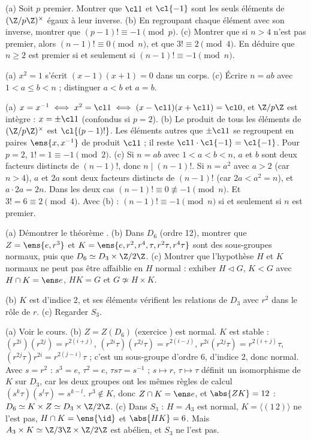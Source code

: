 \begin{exo}
(a) Soit $p$ premier. Montrer que $\cl1$ et $\cl{-1}$ sont les seuls éléments de $(\Z/p\Z)^\times$ égaux à leur inverse. (b) En regroupant chaque élément avec son inverse, montrer que $(p-1)!\equiv-1\pmod p$. (c) Montrer que si $n>4$ n'est pas premier, alors $(n-1)!\equiv0\pmod n$, et que $3!\equiv2\pmod4$. En déduire que $n\ge2$ est premier si et seulement si $(n-1)!\equiv-1\pmod n$.
\begin{indication}
(a) $x^2=1$ s'écrit $(x-1)(x+1)=0$ dans un corps. (c) Écrire $n=ab$ avec $1<a\le b<n$ ; distinguer $a<b$ et $a=b$.
\end{indication}
\begin{corrige}
(a) $x=x^{-1}\iff x^2=\cl1\iff(x-\cl1)(x+\cl1)=\cl0$, et $\Z/p\Z$ est intègre : $x=\pm\cl1$ (confondus si $p=2$).
(b) Le produit de tous les éléments de $(\Z/p\Z)^\times$ est $\cl{(p-1)!}$. Les éléments autres que $\pm\cl1$ se regroupent en paires $\ens{x,x^{-1}}$ de produit $\cl1$ ; il reste $\cl1\cdot\cl{-1}=\cl{-1}$. Pour $p=2$, $1!=1\equiv-1\pmod 2$.
(c) Si $n=ab$ avec $1<a<b<n$, $a$ et $b$ sont deux facteurs distincts de $(n-1)!$, donc $n\mid(n-1)!$. Si $n=a^2$ avec $a>2$ (car $n>4$), $a$ et $2a$ sont deux facteurs distincts de $(n-1)!$ (car $2a<a^2=n$), et $a\cdot2a=2n$. Dans les deux cas $(n-1)!\equiv0\not\equiv-1\pmod n$. Et $3!=6\equiv2\pmod 4$. Avec (b) : $(n-1)!\equiv-1\pmod n$ si et seulement si $n$ est premier.
\end{corrige}
\end{exo}

\begin{exo}
(a) Démontrer le théorème . (b) Dans $D_6$ (ordre 12), montrer que $Z=\ens{e,r^3}$ et $K=\ens{e,r^2,r^4,\tau,r^2\tau,r^4\tau}$ sont des sous-groupes normaux, puis que $D_6\simeq D_3\times\Z/2\Z$. (c) Montrer que l'hypothèse \og $H$ et $K$ normaux \fg{} ne peut pas être affaiblie en \og $H$ normal \fg{} : exhiber $H\lhd G$, $K<G$ avec $H\cap K=\ens e$, $HK=G$ et $G\not\simeq H\times K$.
\begin{indication}
(b) $K$ est d'indice 2, et ses éléments vérifient les relations de $D_3$ avec $r^2$ dans le rôle de $r$. (c) Regarder $S_3$.
\end{indication}
\begin{corrige}
(a) Voir le cours.
(b) $Z=Z(D_6)$ (exercice ) est normal. $K$ est stable : $(r^{2i})(r^{2j})=r^{2(i+j)}$, $(r^{2i}\tau)(r^{2j}\tau)=r^{2(i-j)}$, $r^{2i}(r^{2j}\tau)=r^{2(i+j)}\tau$, $(r^{2j}\tau)r^{2i}=r^{2(j-i)}\tau$ ; c'est un sous-groupe d'ordre 6, d'indice 2, donc normal. Avec $s=r^2$ : $s^3=e$, $\tau^2=e$, $\tau s\tau=s^{-1}$ ; $s\mapsto r$, $\tau\mapsto\tau$ définit un isomorphisme de $K$ sur $D_3$, car les deux groupes ont les mêmes règles de calcul $(s^k\tau)(s^l\tau)=s^{k-l}$. $r^3\notin K$, donc $Z\cap K=\ens e$, et $\abs{ZK}=12$ : $D_6\simeq K\times Z\simeq D_3\times\Z/2\Z$.
(c) Dans $S_3$ : $H=A_3$ est normal, $K=\langle(1\,2)\rangle$ ne l'est pas, $H\cap K=\ens{\id}$ et $\abs{HK}=6$. Mais $A_3\times K\simeq\Z/3\Z\times\Z/2\Z$ est abélien, et $S_3$ ne l'est pas.
\end{corrige}
\end{exo}

